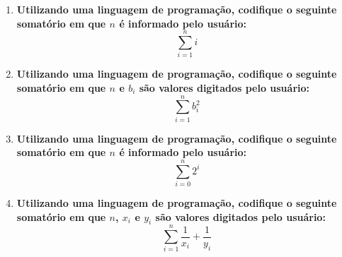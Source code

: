 \begin{enumerate}
	\item \textbf{Utilizando uma linguagem de programação, codifique o seguinte somatório em que $n$ é informado pelo usuário:}
	$$\sum_{i=1}^{n}i$$
	

	\item \textbf{Utilizando uma linguagem de programação, codifique o seguinte somatório em que $n$ e $b_i$ são valores digitados pelo usuário:}
	$$\sum_{i=1}^{n}b_i^2$$
	
	
	\item \textbf{Utilizando uma linguagem de programação, codifique o seguinte somatório em que $n$ é informado pelo usuário:}
	$$\sum_{i=0}^{n}2^i$$
	
	
	\item \textbf{Utilizando uma linguagem de programação, codifique o seguinte somatório em que $n$, $x_i$ e $y_i$ são valores digitados pelo usuário:}
	$$\sum_{i=1}^{n}\frac{1}{x_i}+\frac{1}{y_i}$$
	
	
\end{enumerate}